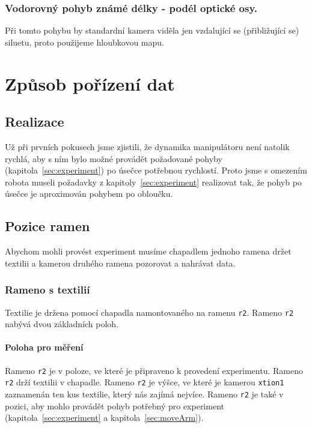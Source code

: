 \documentclass[10pt,a4paper,titlepage,oneside]{report}
\begin{document}
\subsection{Vodorovný pohyb známé délky - podél optické osy.}
Při tomto pohybu by standardní kamera viděla jen vzdalující se (přibližující se) siluetu, proto použijeme hloubkovou mapu.






\chapter{Způsob pořízení dat}

\section{Realizace}
Už při prvních pokusech jsme zjistili, že dynamika manipulátoru není natolik rychlá, aby s ním bylo možné provádět požadované pohyby (kapitola~\ref{sec:experiment}) po úsečce potřebnou rychlostí. Proto jsme s omezením robota museli požadavky z kapitoly~\ref{sec:experiment} realizovat tak, že pohyb po úsečce je aproximován pohybem po obloučku.\\



\section{Pozice ramen}
Abychom mohli provést experiment musíme chapadlem jednoho ramena držet textilii a kamerou druhého ramena pozorovat a nahrávat data.

\subsection{Rameno s textilií}
Textilie je držena pomocí chapadla namontovaného na ramenu \verb|r2|. Rameno \verb|r2| nabývá dvou základních poloh. 
\subsubsection{Poloha pro měření}
Rameno \verb|r2| je v poloze, ve které je připraveno k provedení experimentu. Rameno \verb|r2| drží textilii v chapadle. Rameno \verb|r2| je výšce, ve které je kamerou \verb|xtion1| zaznamenán ten kus textilie, který nás zajímá nejvíce. Rameno \verb|r2| je také v pozici, aby mohlo provádět pohyb potřebný pro experiment (kapitola~\ref{sec:experiment} a kapitola~\ref{sec:moveArm}).
\end{document}
